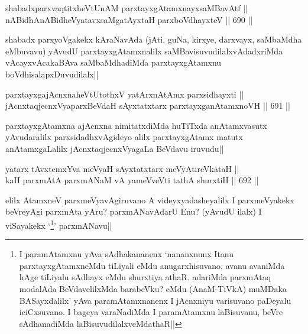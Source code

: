 
\begin{shl}
shabadxparxvaqtitxheVtUnAM parxtayxgAtamxnayxsaMBavAtf || \\
nABidhAnABidheVyatavxsaMgatAyx\s taH parxboVdhayxteV ||  690 ||  
\end{shl}

\begin{artha} 
shabadx parxyoVgakekx kAraNavAda (jAti, guNa, kirxye, darxvayx, 
saMbaMdha eMbuvavu) yAvudU parxtayxgAtamxnalilx 
saMBavisuvudilalxvAdadxriMda vAcayxvAcakaBAva saMbaMdhadiMda 
parxtayxgAtamxnu boVdhisalapxDuvudilalx||
\end{artha}


\begin{shl}
parxtayxgajAcnxnaheVtUtothxV yatArxnAtAmx parxsidhayxti || \\
jAcnxtaqjecnxVyaparxBeVdaH sAyxtatxtarx parxtayxganAtamxnoVH ||  691 ||  
\end{shl}

\begin{artha} 
parxtayxgAtamxna ajAcnxna nimitatxdiMda huTiTxda anAtamxvasutx 
yAvudaralilx parxsidadhxvAgideyo alilx parxtayxgAtamx matutx 
anAtamxgaLalilx jAcnxtaqjecnxVyagaLa BeVdavu iruvudu||
\end{artha}


\begin{shl}
yatarx tAvxtemxYva meVyaH sAyxtatxtarx meVyAtireVkataH || \\
kaH parxmAtA parxmANaM vA yameVveVti tathA shurxtiH ||  692 ||  
\end{shl}

\begin{artha} 
elilx AtamxneV parxmeVyavAgiruvano A videyxyadasheyalilx I 
parxmeVyakekx beVreyAgi parxmAta yAru? parxmANavAdarU Enu? (yAvudU 
ilalx) I viSayakekx `\footnote[1]{I paramAtamxnu yAva sAdhakananenx 
`nananxnunx Itanu parxtayxgAtamxneMdu tiLiyali eMdu anugarxhisuvano, 
avanu avaniMda hAge tiLiyalu sAdhayx eMdu shurxtiya athaR. adariMda 
parxmAtaq modalAda BeVdavelilxMda barabeVku? eMdu (AnaM-TiVkA) muMDaka 
BASayxdalilx' yAva paramAtamxnanenx I jAcnxniyu varisuvano paDeyalu 
iciCxsuvano. I bageya varaNadiMda I paramAtamxnu laBisuvanu, beVre 
sAdhanadiMda laBisuvudilalxveMdathaR||}\stext' parxmANavu||
\end{artha}

